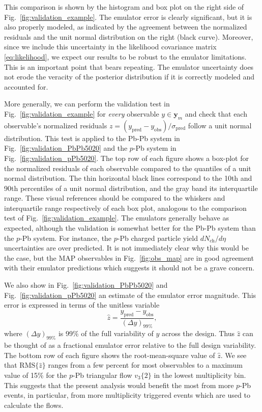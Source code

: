 \documentclass[aps,prc,reprint,amsmath,nofootinbib]{revtex4-1}
\newcommand{\nch}{N_\text{ch}}
\newcommand{\y}{\mathbf{y}}
\begin{document}
This comparison is shown by the histogram and box plot on the right side of Fig.~\ref{fig:validation_example}.
The emulator error is clearly significant, but it is also properly modeled, as indicated by the agreement between the normalized residuals and the unit normal distribution on the right (black curve).
Moreover, since we include this uncertainty in the likelihood covariance matrix \eqref{eq:likelihood}, we expect our results to be robust to the emulator limitations.
This is an important point that bears repeating.
The emulator uncertainty does not erode the veracity of the posterior distribution if it is correctly modeled and accounted for.

More generally, we can perform the validation test in Fig.~\ref{fig:validation_example} for \emph{every} observable $y \in \y_m$ and check that each observable's normalized residuals ${z=(y_\text{pred} - y_\text{obs})/\sigma_\text{pred}}$ follow a unit normal distribution.
This test is applied to the Pb-Pb system in Fig.~\ref{fig:validation_PbPb5020} and the $p$-Pb system in Fig.~\ref{fig:validation_pPb5020}.
The top row of each figure shows a box-plot for the normalized residuals of each observable compared to the quantiles of a unit normal distribution.
The thin horizontal black lines correspond to the 10th and 90th percentiles of a unit normal distribution, and the gray band its interquartile range.
These visual references should be compared to the whiskers and interquartile range respectively of each box plot, analogous to the comparison test of Fig.~\ref{fig:validation_example}.
The emulators generally behave as expected, although the validation is somewhat better for the Pb-Pb system than the $p$-Pb system.
For instance, the $p$-Pb charged particle yield $d\nch/d\eta$ uncertainties are over predicted.
It is not immediately clear why this would be the case, but the MAP observables in Fig.~\ref{fig:obs_map} are in good agreement with their emulator predictions which suggests it should not be a grave concern.

We also show in Fig.~\ref{fig:validation_PbPb5020} and Fig.~\ref{fig:validation_pPb5020} an estimate of the emulator error magnitude.
This error is expressed in terms of the unitless variable
\begin{equation}
  \hat{z} = \frac{y_\text{pred} - y_\text{obs}}{(\Delta y)_{99\%}},
\end{equation}
where $(\Delta y)_{99\%}$ is 99\% of the full variability of $y$ across the design.
Thus $\hat{z}$ can be thought of as a fractional emulator error relative to the full design variability.
The bottom row of each figure shows the root-mean-square value of $\hat{z}$.
We see that $\text{RMS}\{\hat{z}\}$ ranges from a few percent for most observables to a maximum value of 15\% for the $p$-Pb triangular flow $v_3\{2\}$ in the lowest multiplicity bin.
This suggests that the present analysis would benefit the most from more $p$-Pb events, in particular, from more multiplicity triggered events which are used to calculate the flows.
\end{document}
